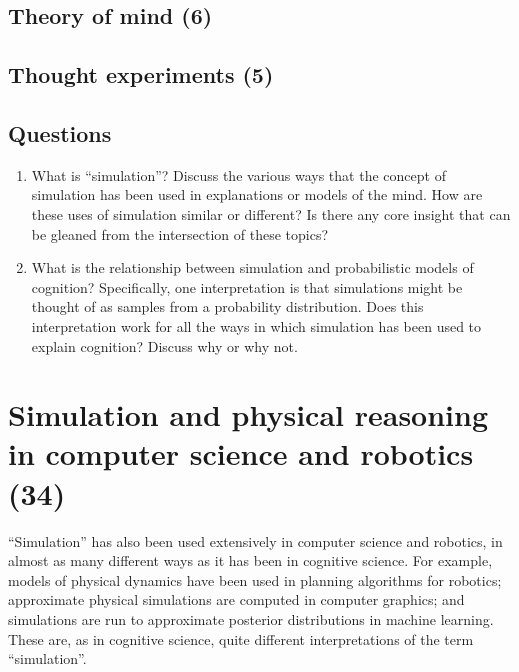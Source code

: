 \documentclass{article}
\begin{document}
\subsection{Theory of mind (6)}

\subsection{Thought experiments (5)}

\subsection{Questions}

\begin{enumerate}
\item What is ``simulation''? Discuss the various ways that the concept of simulation has been used in explanations or models of the mind. How are these uses of simulation similar or different? Is there any core insight that can be gleaned from the intersection of these topics?
\item What is the relationship between simulation and probabilistic models of cognition? Specifically, one interpretation is that simulations might be thought of as samples from a probability distribution. Does this interpretation work for all the ways in which simulation has been used to explain cognition? Discuss why or why not.
\end{enumerate}


\newpage
\section{Simulation and physical reasoning in computer science and robotics (34)}

``Simulation'' has also been used extensively in computer science and robotics, in almost as many different ways as it has been in cognitive science.
For example, models of physical dynamics have been used in planning algorithms for robotics; approximate physical simulations are computed in computer graphics; and simulations are run to approximate posterior distributions in machine learning.
These are, as in cognitive science, quite different interpretations of the term ``simulation''.
\end{document}
